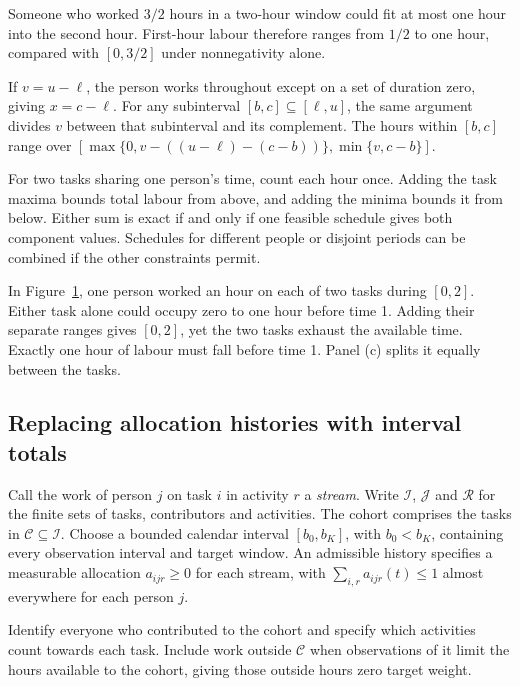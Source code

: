 Someone who worked $3/2$ hours in a two-hour window could fit at most one hour into the second hour. First-hour labour therefore ranges from $1/2$ to one hour, compared with $[0,3/2]$ under nonnegativity alone.

If $v=u-\ell$, the person works throughout except on a set of duration zero, giving $x=c-\ell$. For any subinterval $[b,c]\subseteq[\ell,u]$, the same argument divides $v$ between that subinterval and its complement. The hours within $[b,c]$ range over $[\max\{0,v-((u-\ell)-(c-b))\},\min\{v,c-b\}]$.

For two tasks sharing one person's time, count each hour once. Adding the task maxima bounds total labour from above, and adding the minima bounds it from below. Either sum is exact if and only if one feasible schedule gives both component values. Schedules for different people or disjoint periods can be combined if the other constraints permit.

In Figure~\ref{fig:shared-capacity}, one person worked an hour on each of two tasks during $[0,2]$. Either task alone could occupy zero to one hour before time 1. Adding their separate ranges gives $[0,2]$, yet the two tasks exhaust the available time. Exactly one hour of labour must fall before time 1. Panel (c) splits it equally between the tasks.

\begin{figure}[htp]
\centering

\caption[Shared capacity and first-hour labour]{\protect}
\label{fig:shared-capacity}
\end{figure}

\subsection{Replacing allocation histories with interval totals}

Call the work of person $j$ on task $i$ in activity $r$ a \emph{stream}. Write $\mathcal I$, $\mathcal J$ and $\mathcal R$ for the finite sets of tasks, contributors and activities. The cohort comprises the tasks in $\mathcal C\subseteq\mathcal I$. Choose a bounded calendar interval $[b_0,b_K]$, with $b_0<b_K$, containing every observation interval and target window. An admissible history specifies a measurable allocation $a_{ijr}\geq0$ for each stream, with $\sum_{i,r}a_{ijr}(t)\leq1$ almost everywhere for each person $j$.

Identify everyone who contributed to the cohort and specify which activities count towards each task. Include work outside $\mathcal C$ when observations of it limit the hours available to the cohort, giving those outside hours zero target weight.

